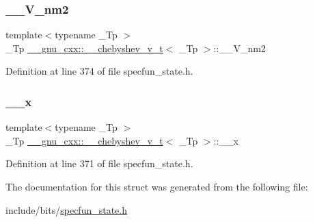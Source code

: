 \subsubsection{\texorpdfstring{\+\_\+\+\_\+\+V\+\_\+nm2}{\_\_V\_nm2}}
{\footnotesize\ttfamily template$<$typename \+\_\+\+Tp $>$ \\
\+\_\+\+Tp \hyperlink{struct____gnu__cxx_1_1____chebyshev__v__t}{\+\_\+\+\_\+gnu\+\_\+cxx\+::\+\_\+\+\_\+chebyshev\+\_\+v\+\_\+t}$<$ \+\_\+\+Tp $>$\+::\+\_\+\+\_\+\+V\+\_\+nm2}



Definition at line 374 of file specfun\+\_\+state.\+h.

\mbox{\label{struct____gnu__cxx_1_1____chebyshev__v__t_a58e22482d8e79ded483fa4816e959a5c}} 
\subsubsection{\texorpdfstring{\+\_\+\+\_\+x}{\_\_x}}
{\footnotesize\ttfamily template$<$typename \+\_\+\+Tp $>$ \\
\+\_\+\+Tp \hyperlink{struct____gnu__cxx_1_1____chebyshev__v__t}{\+\_\+\+\_\+gnu\+\_\+cxx\+::\+\_\+\+\_\+chebyshev\+\_\+v\+\_\+t}$<$ \+\_\+\+Tp $>$\+::\+\_\+\+\_\+x}



Definition at line 371 of file specfun\+\_\+state.\+h.



The documentation for this struct was generated from the following file\+:\begin{DoxyCompactItemize}
\item 
include/bits/\hyperlink{specfun__state_8h}{specfun\+\_\+state.\+h}\end{DoxyCompactItemize}
